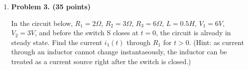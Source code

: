 \begin{enumerate}
\item {\bf Problem 3. (35 points)} 

In the circuit below, $R_1=2\Omega$, $R_2=3\Omega$, $R_3=6\Omega$, $L=0.5H$, 
$V_1=6V$, $V_2=3V$, and before the switch S closes at $t=0$, the circuit is 
already in steady state. Find the current $i_1(t)$ through $R_1$ for $t>0$.
(Hint: as current through an inductor cannot change instantaeously, the 
inductor can be treated as a current source right after the switch is closed.)





\end{enumerate}



